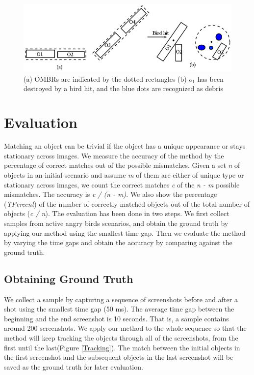 \documentclass[letterpaper]{article}
\begin{document}
 
\begin{figure}[t!]
\centering\includegraphics[scale=0.3]{OMBRs.png}
\vspace{-2.5mm}
\caption{(a) OMBRs are indicated by the dotted rectangles (b) $o_1$ has been destroyed by a bird hit, and the blue dots are recognized as debris}  
\label{OMBRs}
\vspace{-7mm}
\end{figure}

\vspace{-2mm}
\section{Evaluation}

Matching an object can be trivial if the object has a unique appearance or stays stationary across images. We measure the accuracy of the method by the percentage of correct matches out of the possible mismatches. Given a set \emph{n} of objects in an initial scenario and assume \emph{m} of them are either of unique type or stationary across images, we count the correct matches \emph{c} of the \emph{n - m} possible mismatches. The accuracy is  \emph{c / (n - m)}. We also show the percentage (\emph{TPercent}) of the number of correctly matched objects out of the total number of objects (\emph{c / n}). The evaluation has been done in two steps. We first collect samples from active angry birds scenarios, and obtain the ground truth by applying our method using the smallest time gap. Then we evaluate the method by varying the time gaps and obtain the accuracy by comparing against the ground truth.

 
\subsection{Obtaining Ground Truth}

We collect a sample by capturing a sequence of screenshots before and after a shot using the smallest time gap (50 ms). The average time gap between the beginning and the end screenshot is 10 seconds. That is, a sample contains around 200 screenshots.  We apply our method to the whole sequence so that the method will keep tracking the objects through all of the screenshots, from the first until the last(Figure \ref{Tracking}). The match between the initial objects in the first screenshot and the subsequent objects in the last screenshot will be saved as the ground truth for later evaluation. %
\end{document}
